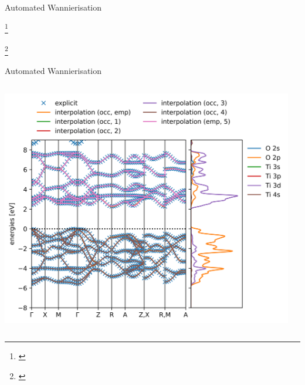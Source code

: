 \documentclass[xcolor=table,aspectratio=169]{beamer}
\newcommand\blfootcite[1]{%
  \begingroup
  \renewcommand\thefootnote{}\footnote{\hspace{-4ex}\cite{#1}}%
  \addtocounter{footnote}{-1}%
  \endgroup
}
\numberwithin{equation}{section}
\begin{document}
\begin{frame}{Automated Wannierisation}

   \blfootcite{Agapito2013}
   \blfootcite{Qiao2023,Qiao2023a}

\end{frame}

\begin{frame}{Automated Wannierisation}
   \vspace{-2ex}
   \begin{columns}
      \begin{column}{0.5\textwidth}
         \includegraphics[width=\columnwidth]{figures/TiO2_wannierize_bandstructure.png}
      \end{column}
      \begin{column}{0.5\textwidth}
      \end{column}
   \end{columns}
\end{frame}
\end{document}

